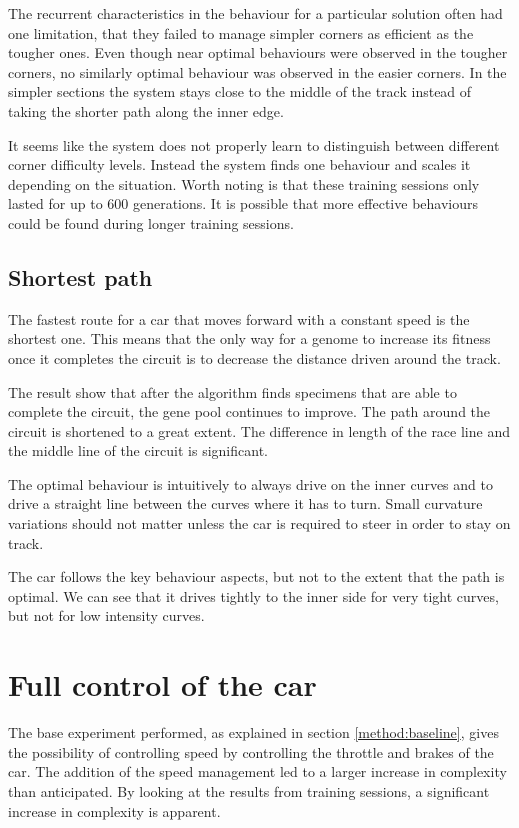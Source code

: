 The recurrent characteristics in the behaviour for a particular solution often had one limitation, that they failed to manage simpler corners as efficient as the tougher ones. Even though near optimal behaviours were observed in the tougher corners, no similarly optimal behaviour was observed in the easier corners. In the simpler sections the system stays close to the middle of the track instead of taking the shorter path along the inner edge. 

It seems like the system does not properly learn to distinguish between different corner difficulty levels. Instead the system finds one behaviour and scales it depending on the situation. Worth noting is that these training sessions only lasted for up to $600$ generations. It is possible that more effective behaviours could be found during longer training sessions. 

\subsection{Shortest path}
The fastest route for a car that moves forward with a constant speed is the shortest one. This means that the only way for a genome to increase its fitness once it completes the circuit is to decrease the distance driven around the track.  

The result show that after the algorithm finds specimens that are able to complete the circuit, the gene pool continues to improve. The path around the circuit is shortened to a great extent. The difference in length of the race line and the middle line of the circuit is significant. 

The optimal behaviour is intuitively to always drive on the inner curves and to drive a straight line between the curves where it has to turn. Small curvature variations should not matter unless the car is required to steer in order to stay on track. 

The car follows the key behaviour aspects, but not to the extent that the path is optimal. We can see that it drives tightly to the inner side for very tight curves, but not for low intensity curves.


\section{Full control of the car}

The base experiment performed, as explained in section \ref{method:baseline}, gives the possibility of controlling speed by controlling the throttle and brakes of the car. The addition of the speed management led to a larger increase in complexity than anticipated. By looking at the results from training sessions, a significant increase in complexity is apparent.

